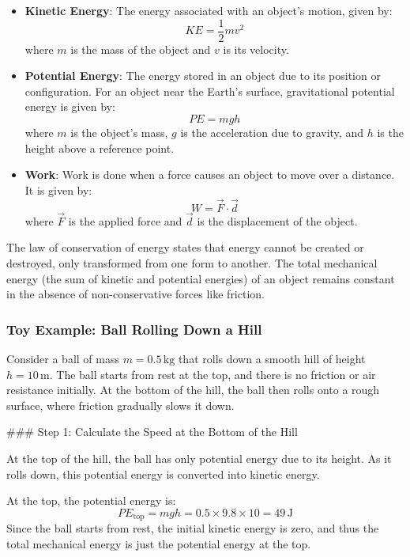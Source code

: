 \documentclass{article}
\begin{document}
\begin{itemize}
    \item \textbf{Kinetic Energy}: The energy associated with an object's motion, given by:
    \[
    KE = \frac{1}{2} m v^2
    \]
    where \(m\) is the mass of the object and \(v\) is its velocity.
    
    \item \textbf{Potential Energy}: The energy stored in an object due to its position or configuration. For an object near the Earth's surface, gravitational potential energy is given by:
    \[
    PE = mgh
    \]
    where \(m\) is the object's mass, \(g\) is the acceleration due to gravity, and \(h\) is the height above a reference point.
    
    \item \textbf{Work}: Work is done when a force causes an object to move over a distance. It is given by:
    \[
    W = \vec{F} \cdot \vec{d}
    \]
    where \( \vec{F} \) is the applied force and \( \vec{d} \) is the displacement of the object.
\end{itemize}

The law of conservation of energy states that energy cannot be created or destroyed, only transformed from one form to another. The total mechanical energy (the sum of kinetic and potential energies) of an object remains constant in the absence of non-conservative forces like friction.

\subsubsection*{Toy Example: Ball Rolling Down a Hill}

Consider a ball of mass \( m = 0.5 \, \text{kg} \) that rolls down a smooth hill of height \( h = 10 \, \text{m} \). The ball starts from rest at the top, and there is no friction or air resistance initially. At the bottom of the hill, the ball then rolls onto a rough surface, where friction gradually slows it down.

### Step 1: Calculate the Speed at the Bottom of the Hill

At the top of the hill, the ball has only potential energy due to its height. As it rolls down, this potential energy is converted into kinetic energy.

At the top, the potential energy is:
\[
PE_{\text{top}} = mgh = 0.5 \times 9.8 \times 10 = 49 \, \text{J}
\]
Since the ball starts from rest, the initial kinetic energy is zero, and thus the total mechanical energy is just the potential energy at the top.
\end{document}
